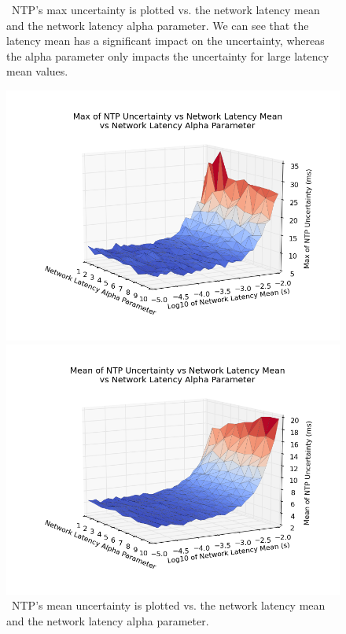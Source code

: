 \begin{figure}[!htbp]
  \caption{~NTP's max uncertainty is plotted vs. the network latency mean and the network latency alpha parameter. We can see that the latency mean has a significant impact on the uncertainty, whereas the alpha parameter only impacts the uncertainty for large latency mean values.}
  \label{fig:max-uncertainty_latency-mean_latency-alpha}
  \includegraphics[width=0.8\linewidth]{max_error-latency_mean-latency_alpha.png}

  \caption{~NTP's mean uncertainty is plotted vs. the network latency mean and the network latency alpha parameter.}
  \label{fig:mean-uncertainty_latency-mean_latency-alpha}
  \includegraphics[width=0.8\linewidth]{mean_max_error-mean_latency-latency_alpha.png}  
\end{figure}

